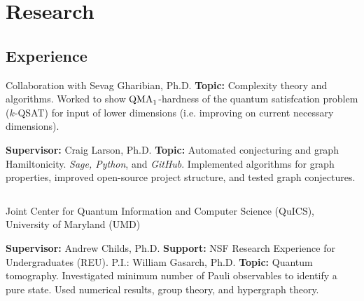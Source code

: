 \documentclass[11pt,letterpaper,serif]{moderncv}
\begin{document}

\section{Research}
\subsection{Experience}
{	
	\begin{adjustwidth}{.25in}{}
		Collaboration with Sevag Gharibian, Ph.D. \newline
		\textbf{Topic:} Complexity theory and algorithms. Worked to show $\textup{QMA}_{1}$-hardness of the quantum satisfcation problem ($k$-QSAT) for input of lower dimensions (i.e. improving on current necessary dimensions).
	\end{adjustwidth}
}

{	
	\begin{adjustwidth}{.25in}{}
		\textbf{Supervisor:} Craig Larson, Ph.D. \newline
		\textbf{Topic:} Automated conjecturing and graph Hamiltonicity. \textit{Sage, Python}, and \textit{GitHub}. Implemented algorithms for graph properties, improved open-source project structure, and tested graph conjectures.
	\end{adjustwidth}
}

{
	$\!$\begin{minipage}{0.8\textwidth}
		Joint Center for Quantum Information and Computer Science (QuICS), \newline
		University of Maryland (UMD)	
	\end{minipage}
}
{}{}
{	
	\begin{adjustwidth}{.25in}{}
		\textbf{Supervisor:} Andrew Childs, Ph.D. \newline
		\textbf{Support:} NSF Research Experience for Undergraduates (REU). P.I.: William Gasarch, Ph.D. \newline
		\textbf{Topic:} Quantum tomography. Investigated minimum number of Pauli observables to identify a pure state. Used numerical results, group theory, and hypergraph theory.
	\end{adjustwidth}
}
\end{document}
